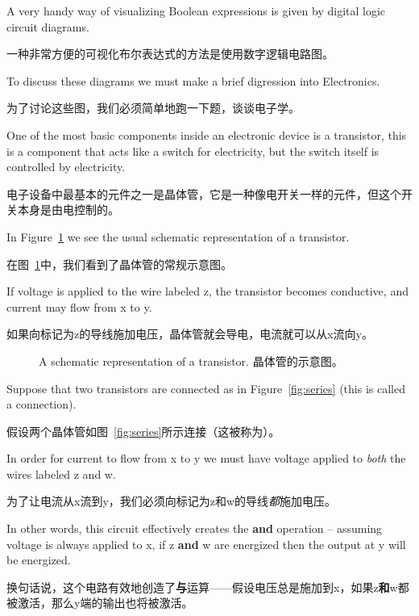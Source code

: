 A very handy way of visualizing Boolean expressions is given by
digital logic circuit diagrams.

一种非常方便的可视化布尔表达式的方法是使用数字逻辑电路图。

To discuss these diagrams we 
must make a brief digression into Electronics.

为了讨论这些图，我们必须简单地跑一下题，谈谈电子学。

One of the most
basic components inside an electronic device is a 
transistor,
this is a component that acts like a switch for electricity,
but the switch itself is controlled by electricity.

电子设备中最基本的元件之一是晶体管，它是一种像电开关一样的元件，但这个开关本身是由电控制的。

In Figure~\ref{fig:trans}
we see the usual schematic representation of a transistor.

在图~\ref{fig:trans}中，我们看到了晶体管的常规示意图。

If voltage
is applied to the wire labeled z, the transistor becomes conductive,
and current may flow from x to y.

如果向标记为z的导线施加电压，晶体管就会导电，电流就可以从x流向y。

\begin{figure}[!hbtp] 
\begin{center}

\end{center}
\caption{A schematic representation of a transistor. 晶体管的示意图。}
\label{fig:trans}
\end{figure}

Suppose that two transistors are connected as in Figure~\ref{fig:series}
(this is called a  connection).

假设两个晶体管如图~\ref{fig:series}所示连接（这被称为）。

In order for current to flow
from x to y we must have voltage applied to {\em both} the wires labeled
z and w.

为了让电流从x流到y，我们必须向标记为z和w的导线{\em 都}施加电压。

In other words, this circuit effectively creates the {\bf and} 
operation --  assuming voltage is always applied to x, if z {\bf and} w
are energized then the output at y will be energized.

换句话说，这个电路有效地创造了{\bf 与}运算——假设电压总是施加到x，如果z{\bf 和}w都被激活，那么y端的输出也将被激活。

